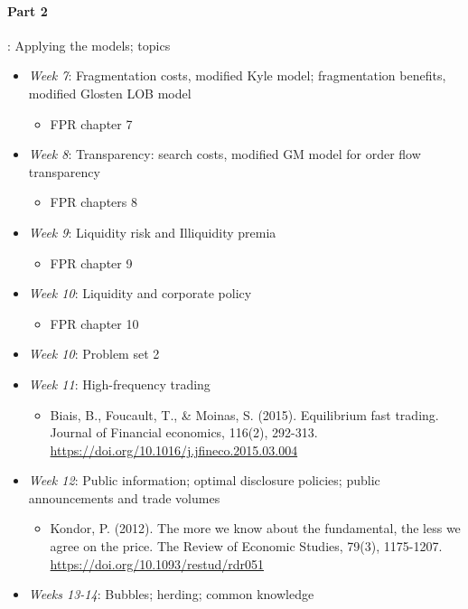 \documentclass{article}
\begin{document}
\medskip
\paragraph{Part 2}: Applying the models; topics
\begin{itemize}
	\item \textit{Week 7}: Fragmentation costs, {modified Kyle model}; fragmentation benefits, {modified Glosten LOB model}
	\begin{itemize}
		\item FPR chapter 7
	\end{itemize}
	\item \textit{Week 8}: Transparency: search costs, {modified GM model} for order flow transparency
	\begin{itemize}
		\item FPR chapters 8
	\end{itemize}
	\item \textit{Week 9}: Liquidity risk and Illiquidity premia
	\begin{itemize}
		\item FPR chapter 9
	\end{itemize}
	\item \textit{Week 10}: Liquidity and corporate policy
	\begin{itemize}
		\item FPR chapter 10
	\end{itemize}
	\item \textit{Week 10}: Problem set 2
	\item \textit{Week 11}: High-frequency trading
	\begin{itemize}
		\item Biais, B., Foucault, T., \& Moinas, S. (2015). Equilibrium fast trading. Journal of Financial economics, 116(2), 292-313. \url{https://doi.org/10.1016/j.jfineco.2015.03.004}
	\end{itemize}
	\item \textit{Week 12}: Public information; optimal disclosure policies; public announcements and trade volumes
	\begin{itemize}
		\item Kondor, P. (2012). The more we know about the fundamental, the less we agree on the price. The Review of Economic Studies, 79(3), 1175-1207. \url{https://doi.org/10.1093/restud/rdr051}
	\end{itemize}
	\item \textit{Weeks 13-14}: Bubbles; herding; common knowledge
	\begin{itemize}

\end{itemize}
\end{itemize}
\end{document}
